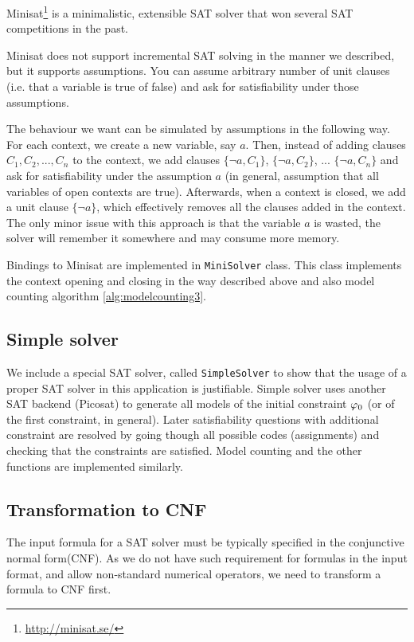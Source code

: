 Minisat\footnote{\url{http://minisat.se/}} \cite{minisat} is a minimalistic,
  extensible SAT solver that won several SAT competitions in the past.

Minisat does not support incremental SAT solving in the manner we described,
  but it supports assumptions.
You can assume arbitrary number of unit clauses
  (i.e. that a variable is true of false) and ask for satisfiability under
  those assumptions.

The behaviour we want can be simulated by assumptions in the following way.
For each context, we create a new variable, say $a$.
Then, instead of adding clauses $C_1, C_2, ..., C_n$ to the context,
  we add clauses $\{\neg a, C_1\}$, $\{\neg a, C_2\}$, ... $\{\neg a, C_n\}$ and ask
  for satisfiability under the assumption $a$ (in general,
  assumption that all variables of open contexts are true).
Afterwards, when a context is closed, we add a unit clause $\{\neg a\}$,
  which effectively removes all the clauses added in the context.
The only minor issue with this approach is that the variable $a$ is wasted,
  the solver will remember it somewhere and may consume more memory.

Bindings to Minisat are implemented in \texttt{MiniSolver} class.
This class implements the context opening and closing in the way described above
and also model counting algorithm \ref{alg:modelcounting3}.

\subsection{Simple solver}

We include a special SAT solver, called \texttt{SimpleSolver} to show that
  the usage of a proper SAT solver in this application is justifiable.
Simple solver uses another SAT backend (Picosat) to generate all
  models of the initial constraint $\varphi_0$ (or of the first constraint, in general).
Later satisfiability questions with additional constraint are
  resolved by going though all possible codes (assignments) and
  checking that the constraints are satisfied.
Model counting and the other functions are implemented similarly.

\subsection{Transformation to CNF}

The input formula for a SAT solver must be typically specified
  in the conjunctive normal form(CNF).
As we do not have such requirement for formulas in the input format,
  and allow non-standard numerical operators,
  we need to transform a formula to CNF first.

